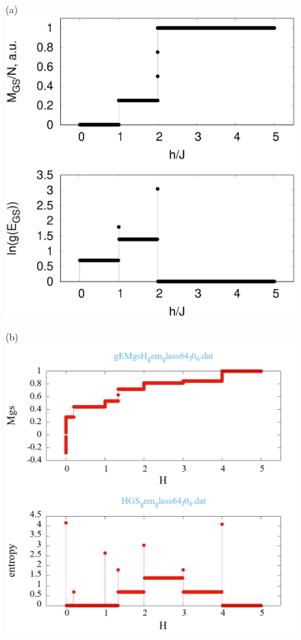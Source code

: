 \documentclass[utf8, babel, sor, jor, amsmath, amssymb, reprint]{elsarticle} %
\begin{document}
\begin{figure}[H]
	\begin{minipage}[h]{0.32\linewidth}
		\centering(a)
		\includegraphics[width=1\linewidth]{pictures/_multiplot_SI64_J0_1}
	\end{minipage}
	\hfill
	\begin{minipage}[h]{0.32\linewidth}
		\centering(b)
		\includegraphics[width=1\linewidth]{pictures/_multiplot_SG64_J0}

\end{minipage}
\end{figure}
\end{document}
